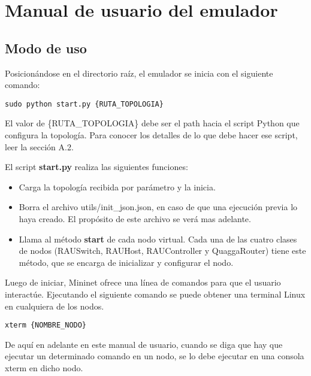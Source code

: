 
\chapter{Manual de usuario del emulador}

\section{Modo de uso}
Posicionándose en el directorio raíz, el emulador se inicia con el siguiente comando:
\begin{lstlisting}
sudo python start.py {RUTA_TOPOLOGIA}
\end{lstlisting}

El valor de \{RUTA\_TOPOLOGIA\} debe ser el path hacia el script Python que configura la topología. Para conocer los detalles de lo que debe hacer ese script, leer la sección A.2.

El script \textbf{start.py} realiza las siguientes funciones:
\begin{itemize}
	\item Carga la topología recibida por parámetro y la inicia.
	\item Borra el archivo utils/init\_json.json, en caso de que una ejecución previa lo haya creado. El propósito de este archivo se verá mas adelante.
	\item Llama al método \textbf{start} de cada nodo virtual. Cada una de las cuatro clases de nodos (RAUSwitch, RAUHost, RAUController y QuaggaRouter) tiene este método, que se encarga de inicializar y configurar el nodo.
\end{itemize}

Luego de iniciar, Mininet ofrece una línea de comandos para que el usuario interactúe. Ejecutando el siguiente comando se puede obtener una terminal Linux en cualquiera de los nodos.
\begin{lstlisting}
xterm {NOMBRE_NODO}
\end{lstlisting}

De aquí en adelante en este manual de usuario, cuando se diga que hay que ejecutar un determinado comando en un nodo, se lo debe ejecutar en una consola xterm en dicho nodo.

